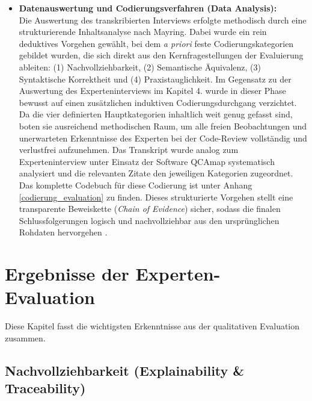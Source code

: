 \begin{itemize}
    Im direkten Anschluss an diese offene Phase wurde ein semi-strukturiertes Interview geführt \parencite{runesonGuidelinesConductingReporting2009}. Anhand eines kurzen Leitfadens (Anhang \ref{leitfaden_evaluation}) wurden die zuvor definierten Kernfragestellungen (Nachvollziehbarkeit, Semantik, Syntax, Praxistauglichkeit) gezielt abgefragt, um die freien Beobachtungen des Experten strukturiert zusammenzufassen.

    \item \textbf{Datenauswertung und Codierungsverfahren (Data Analysis):} \\
    Die Auswertung des transkribierten Interviews erfolgte methodisch durch eine strukturierende Inhaltsanalyse nach Mayring. Dabei wurde ein rein deduktives Vorgehen gewählt, bei dem \textit{a priori} feste Codierungskategorien gebildet wurden, die sich direkt aus den Kernfragestellungen der Evaluierung ableiten: (1) Nachvollziehbarkeit, (2) Semantische Äquivalenz, (3) Syntaktische Korrektheit und (4) Praxistauglichkeit. Im Gegensatz zu der Auswertung des Experteninterviews im Kapitel 4. wurde in dieser Phase bewusst auf einen zusätzlichen induktiven Codierungsdurchgang verzichtet. Da die vier definierten Hauptkategorien inhaltlich weit genug gefasst sind, boten sie ausreichend methodischen Raum, um alle freien Beobachtungen und unerwarteten Erkenntnisse des Experten bei der Code-Review vollständig und verlustfrei aufzunehmen. Das Transkript wurde analog zum Experteninterview unter Einsatz der Software QCAmap systematisch analysiert und die relevanten Zitate den jeweiligen Kategorien zugeordnet. Das komplette Codebuch für diese Codierung ist unter Anhang \ref{codierung_evaluation} zu finden. Dieses strukturierte Vorgehen stellt eine transparente Beweiskette (\textit{Chain of Evidence}) sicher, sodass die finalen Schlussfolgerungen logisch und nachvollziehbar aus den ursprünglichen Rohdaten hervorgehen \parencite{runesonGuidelinesConductingReporting2009}.
\end{itemize}
\newpage
\section{Ergebnisse der Experten-Evaluation}
\label{subsec:ergebnisse_evaluation}

Diese Kapitel fasst die wichtigsten Erkenntnisse aus der qualitativen Evaluation zusammen.

\subsection{Nachvollziehbarkeit (Explainability \& Traceability)}
\label{subsubsec:eval_nachvollziehbarkeit}

